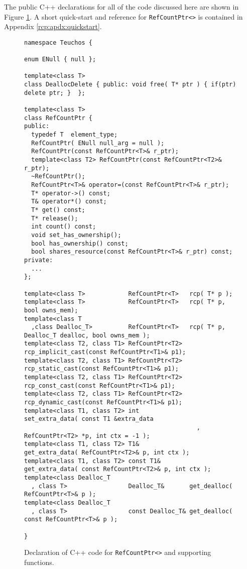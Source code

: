 The public C++ declarations for all of the code discussed here are
shown in Figure {}\ref{rcp:fig:decl}.  A short quick-start and
reference for {}\texttt{RefCountPtr<>} is contained in Appendix
{}\ref{rcp:apdx:quickstart}.

\begin{figure}

{\scriptsize\begin{verbatim}
namespace Teuchos {

enum ENull { null };

template<class T>
class DeallocDelete { public: void free( T* ptr ) { if(ptr) delete ptr; }  };

template<class T>
class RefCountPtr {
public:
  typedef T  element_type;
  RefCountPtr( ENull null_arg = null );
  RefCountPtr(const RefCountPtr<T>& r_ptr);
  template<class T2> RefCountPtr(const RefCountPtr<T2>& r_ptr);
  ~RefCountPtr();
  RefCountPtr<T>& operator=(const RefCountPtr<T>& r_ptr);
  T* operator->() const;
  T& operator*() const;
  T* get() const;
  T* release();
  int count() const;
  void set_has_ownership();
  bool has_ownership() const;
  bool shares_resource(const RefCountPtr<T>& r_ptr) const;
private:
  ...
};

template<class T>            RefCountPtr<T>   rcp( T* p );
template<class T>            RefCountPtr<T>   rcp( T* p, bool owns_mem);
template<class T
  ,class Dealloc_T>          RefCountPtr<T>   rcp( T* p, Dealloc_T dealloc, bool owns_mem );
template<class T2, class T1> RefCountPtr<T2>  rcp_implicit_cast(const RefCountPtr<T1>& p1);
template<class T2, class T1> RefCountPtr<T2>  rcp_static_cast(const RefCountPtr<T1>& p1);
template<class T2, class T1> RefCountPtr<T2>  rcp_const_cast(const RefCountPtr<T1>& p1);
template<class T2, class T1> RefCountPtr<T2>  rcp_dynamic_cast(const RefCountPtr<T1>& p1);
template<class T1, class T2> int              set_extra_data( const T1 &extra_data
                                                , RefCountPtr<T2> *p, int ctx = -1 );
template<class T1, class T2> T1&              get_extra_data( RefCountPtr<T2>& p, int ctx );
template<class T1, class T2> const T1&        get_extra_data( const RefCountPtr<T2>& p, int ctx );
template<class Dealloc_T
  , class T>                 Dealloc_T&       get_dealloc( RefCountPtr<T>& p );
template<class Dealloc_T
  , class T>                 const Dealloc_T& get_dealloc( const RefCountPtr<T>& p );

}
\end{verbatim}}
\caption{\label{rcp:fig:decl}
Declaration of C++ code for {}\texttt{RefCountPtr<>} and supporting functions.}
\end{figure}

